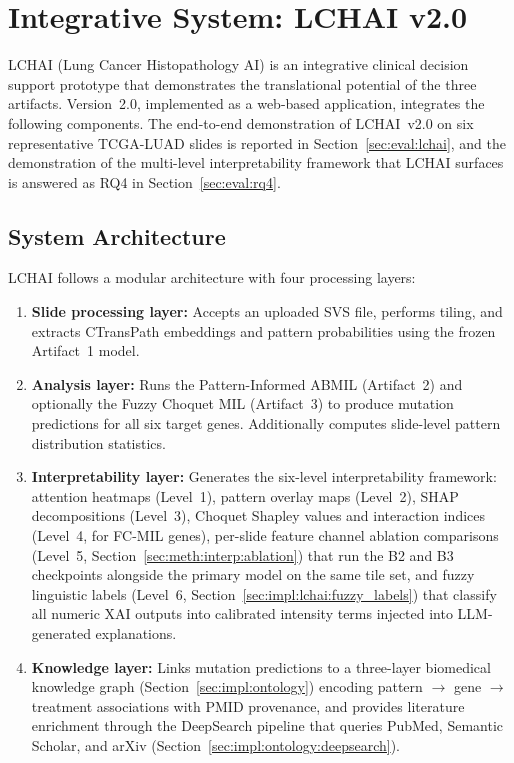 \section{Integrative System: LCHAI v2.0}
\label{sec:impl:lchai}

LCHAI (Lung Cancer Histopathology AI) is an integrative clinical decision support prototype that demonstrates the translational potential of the three artifacts.
Version~2.0, implemented as a web-based application, integrates the following components.
The end-to-end demonstration of LCHAI~v2.0 on six representative
TCGA-LUAD slides is reported in Section~\ref{sec:eval:lchai}, and
the demonstration of the multi-level interpretability framework
that LCHAI surfaces is answered as RQ4 in
Section~\ref{sec:eval:rq4}.

\subsection{System Architecture}
\label{sec:impl:lchai:arch}

LCHAI follows a modular architecture with four processing layers:

\begin{enumerate}
    \item \textbf{Slide processing layer:} Accepts an uploaded SVS file, performs tiling, and extracts CTransPath embeddings and pattern probabilities using the frozen Artifact~1 model.

    \item \textbf{Analysis layer:} Runs the Pattern-Informed ABMIL (Artifact~2) and optionally the Fuzzy Choquet MIL (Artifact~3) to produce mutation predictions for all six target genes. Additionally computes slide-level pattern distribution statistics.

    \item \textbf{Interpretability layer:} Generates the six-level
    interpretability framework: attention heatmaps (Level~1), pattern
    overlay maps (Level~2), SHAP decompositions (Level~3), Choquet
    Shapley values and interaction indices (Level~4, for FC-MIL genes),
    per-slide feature channel ablation comparisons (Level~5,
    Section~\ref{sec:meth:interp:ablation}) that run the B2 and B3
    checkpoints alongside the primary model on the same tile set, and
    fuzzy linguistic labels (Level~6,
    Section~\ref{sec:impl:lchai:fuzzy_labels}) that classify all
    numeric XAI outputs into calibrated intensity terms injected into
    LLM-generated explanations.

    \item \textbf{Knowledge layer:} Links mutation predictions to a three-layer biomedical knowledge graph (Section~\ref{sec:impl:ontology}) encoding pattern $\to$ gene $\to$ treatment associations with PMID provenance, and provides literature enrichment through the DeepSearch pipeline that queries PubMed, Semantic Scholar, and arXiv (Section~\ref{sec:impl:ontology:deepsearch}).
\end{enumerate}


